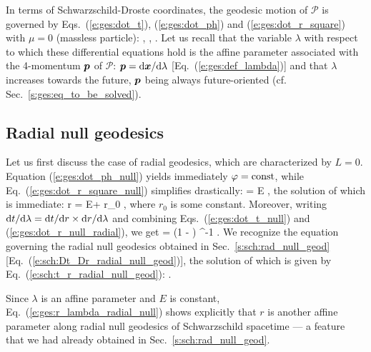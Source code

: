 In terms of Schwarzschild-Droste coordinates, the geodesic motion of $\mathscr{P}$ is governed by Eqs.~(\ref{e:ges:dot_t}), (\ref{e:ges:dot_ph}) and (\ref{e:ges:dot_r_square})
with $\mu=0$ (massless particle):
\be \label{e:ges:dot_t_null}
    ,
\ee
\be \label{e:ges:dot_ph_null}
   ,
\ee
\be \label{e:ges:dot_r_square_null}
   .
\ee
Let us recall that the variable $\lambda$ with respect to which these differential equations
hold
is the affine parameter associated with the 4-momentum $\bm{p}$ of $\mathscr{P}$:
$\bm{p} = \mathrm{d}\bm{x}/\mathrm{d}\lambda$ [Eq.~(\ref{e:ges:def_lambda})] and that
$\lambda$ increases towards the future,
$\bm{p}$ being always future-oriented (cf. Sec.~\ref{s:ges:eq_to_be_solved}).

\subsection{Radial null geodesics} \label{s:gis:radial}

Let us first discuss the case of radial geodesics, which are characterized by $L=0$.
Equation (\ref{e:ges:dot_ph_null}) yields immediately $\varphi=\mathrm{const}$,
while Eq.~(\ref{e:ges:dot_r_square_null}) simplifies drastically:
\be \label{e:ges:dot_r_null_radial}
     = \pm E ,
\ee
the solution of which is immediate:
\be \label{e:ges:r_lambda_radial_null}
    r = \pm E\lambda + r_0 ,
\ee
where $r_0$ is some constant.
Moreover, writing $\mathrm{d} t/\mathrm{d}\lambda = \mathrm{d} t/\mathrm{d} r \times \mathrm{d} r/\mathrm{d}\lambda$
and combining Eqs.~(\ref{e:ges:dot_t_null}) and (\ref{e:ges:dot_r_null_radial}),
we get
\be \label{e:gis:dtdr_radial_geod}
     = \pm \left(1 -  \right) ^{-1} .
\ee
We recognize the equation governing the radial null geodesics obtained in
Sec.~\ref{s:sch:rad_null_geod} [Eq.~(\ref{e:sch:Dt_Dr_radial_null_geod})],
the solution of which is given by Eq.~(\ref{e:sch:t_r_radial_null_geod}):
\be
   .
\ee

\begin{remark}
Since $\lambda$ is an affine parameter and $E$ is constant,
Eq.~(\ref{e:ges:r_lambda_radial_null})
shows explicitly that $r$ is another affine parameter along radial null
geodesics of Schwarzschild spacetime --- a feature that we had already
obtained in Sec.~\ref{s:sch:rad_null_geod}.
\end{remark}

